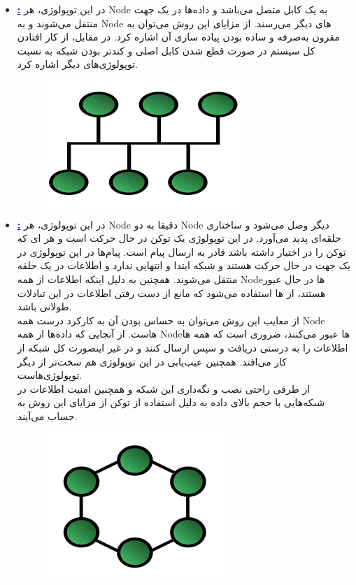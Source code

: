 \documentclass[]{article}
\newcommand{\link}[2]{\href{#1}{\textcolor{blue}{#2}}}
\begin{document}
\begin{itemize}
	\item \link{https://en.wikipedia.org/wiki/Bus_network}{\textbf{\lr{Bus Topology}:}} در این توپولوژی، هر Node به یک کابل متصل می‌باشد و داده‌ها در یک جهت منتقل می‌شوند و به Node های دیگر می‌رسند.
	از مزایای این روش می‌توان به مقرون به‌صرفه و ساده بودن پیاده سازی آن اشاره کرد. در مقابل، از کار افتادن کل سیستم در صورت قطع شدن کابل اصلی و کندتر بودن شبکه به نسبت توپولوژی‌های دیگر اشاره کرد.
	\begin{figure}[H]
		\centerline{\includegraphics[scale=0.8]{resources/bus.png}}
	\end{figure}
	\item \link{https://en.wikipedia.org/wiki/Bus_network}{\textbf{\lr{Ring Topology}:}} در این توپولوژی، هر Node دقیقا به دو Node دیگر وصل می‌شود و ساختاری حلقه‌ای پدید می‌آورد. در این توپولوژی یک توکن در حال حرکت است و هر ای که توکن را در اختیار داشته باشد قادر به ارسال پیام است. پیام‌ها در این توپولوژی در یک جهت در حال حرکت هستند و شبکه ابتدا و انتهایی ندارد و اطلاعات در یک حلقه منتقل می‌شوند. همچنین به دلیل اینکه اطلاعات از همه Nodeها در حال عبور هستند، از ها استفاده می‌شود که مانع از دست رفتن اطلاعات در این تبادلات طولانی باشد.\\
	از معایب این روش می‌توان به حساس بودن آن به کارکرد درست همه Node هاست. از آنجایی که داده‌ها از همه Nodeها عبور می‌کنند، ضروری است که همه ها اطلاعات را به درستی دریافت و سپس ارسال کنند و در غیر اینصورت کل شبکه از کار می‌افتد. همچنین عیب‌یابی در این توپولوژی هم سخت‌تر از دیگر توپولوژی‌هاست.\\
	از طرفی راحتی نصب و نگه‌داری این شبکه و همچنین امنیت اطلاعات در شبکه‌هایی با حجم بالای داده به دلیل استفاده از توکن از مزایای این روش به حساب می‌آیند.
	\begin{figure}[H]
		\centerline{\includegraphics[scale=0.8]{resources/ring.png}}

\end{figure}
\end{itemize}
\end{document}
